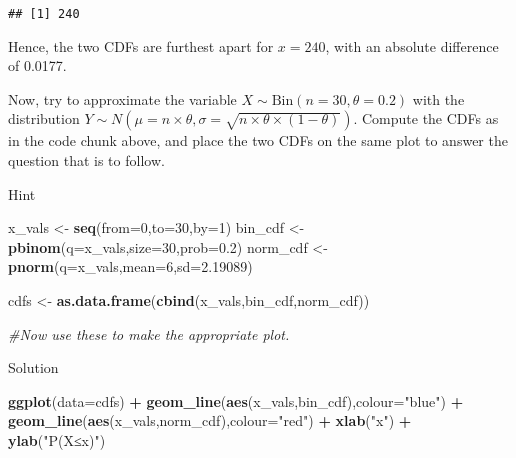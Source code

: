 \documentclass[
]{book}
\newenvironment{Shaded}{\begin{snugshade}}{\end{snugshade}}
\newcommand{\AttributeTok}[1]{\textcolor[rgb]{0.13,0.29,0.53}{#1}}
\newcommand{\CommentTok}[1]{\textcolor[rgb]{0.56,0.35,0.01}{\textit{#1}}}
\newcommand{\DecValTok}[1]{\textcolor[rgb]{0.00,0.00,0.81}{#1}}
\newcommand{\FloatTok}[1]{\textcolor[rgb]{0.00,0.00,0.81}{#1}}
\newcommand{\FunctionTok}[1]{\textcolor[rgb]{0.13,0.29,0.53}{\textbf{#1}}}
\newcommand{\NormalTok}[1]{#1}
\newcommand{\OtherTok}[1]{\textcolor[rgb]{0.56,0.35,0.01}{#1}}
\newcommand{\SpecialCharTok}[1]{\textcolor[rgb]{0.81,0.36,0.00}{\textbf{#1}}}
\newcommand{\StringTok}[1]{\textcolor[rgb]{0.31,0.60,0.02}{#1}}
\begin{document}
\begin{verbatim}
## [1] 240
\end{verbatim}

Hence, the two CDFs are furthest apart for \(x=240\), with an absolute difference of 0.0177.

Now, try to approximate the variable \(X \sim \mbox{Bin}(n=30,\theta=0.2)\) with the distribution \(Y \sim N\left(\mu=n \times \theta,\sigma=\sqrt{n \times \theta \times (1-\theta)}\right)\). Compute the CDFs as in the code chunk above, and place the two CDFs on the same plot to answer the question that is to follow.

Hint

\begin{Shaded}
\begin{Highlighting}[]
\NormalTok{x\_vals }\OtherTok{\textless{}{-}} \FunctionTok{seq}\NormalTok{(}\AttributeTok{from=}\DecValTok{0}\NormalTok{,}\AttributeTok{to=}\DecValTok{30}\NormalTok{,}\AttributeTok{by=}\DecValTok{1}\NormalTok{)}
\NormalTok{bin\_cdf }\OtherTok{\textless{}{-}} \FunctionTok{pbinom}\NormalTok{(}\AttributeTok{q=}\NormalTok{x\_vals,}\AttributeTok{size=}\DecValTok{30}\NormalTok{,}\AttributeTok{prob=}\FloatTok{0.2}\NormalTok{)}
\NormalTok{norm\_cdf }\OtherTok{\textless{}{-}} \FunctionTok{pnorm}\NormalTok{(}\AttributeTok{q=}\NormalTok{x\_vals,}\AttributeTok{mean=}\DecValTok{6}\NormalTok{,}\AttributeTok{sd=}\FloatTok{2.19089}\NormalTok{)}

\NormalTok{cdfs }\OtherTok{\textless{}{-}} \FunctionTok{as.data.frame}\NormalTok{(}\FunctionTok{cbind}\NormalTok{(x\_vals,bin\_cdf,norm\_cdf))}

\CommentTok{\#Now use these to make the appropriate plot.}
\end{Highlighting}
\end{Shaded}

Solution

\begin{Shaded}
\begin{Highlighting}[]
\FunctionTok{ggplot}\NormalTok{(}\AttributeTok{data=}\NormalTok{cdfs) }\SpecialCharTok{+} \FunctionTok{geom\_line}\NormalTok{(}\FunctionTok{aes}\NormalTok{(x\_vals,bin\_cdf),}\AttributeTok{colour=}\StringTok{"blue"}\NormalTok{) }\SpecialCharTok{+} \FunctionTok{geom\_line}\NormalTok{(}\FunctionTok{aes}\NormalTok{(x\_vals,norm\_cdf),}\AttributeTok{colour=}\StringTok{"red"}\NormalTok{) }\SpecialCharTok{+} \FunctionTok{xlab}\NormalTok{(}\StringTok{"x"}\NormalTok{) }\SpecialCharTok{+} \FunctionTok{ylab}\NormalTok{(}\StringTok{"P(X≤x)"}\NormalTok{) }
\end{Highlighting}
\end{Shaded}
\end{document}
